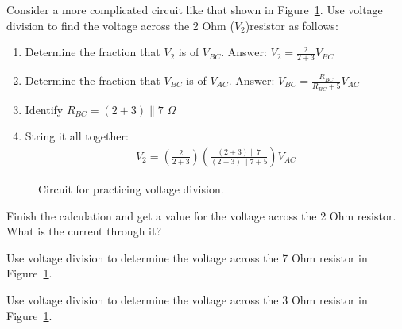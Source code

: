 Consider a more complicated circuit like that shown in Figure~\ref{F:3VD}. Use voltage division to find the voltage across the 2 Ohm ($V_2$)resistor as follows:

\begin{enumerate}
\item Determine the fraction that $V_2$ is of $V_{BC}$. Answer: $V_2=\frac{2}{2+3}V_{BC}$
\item Determine the fraction that $V_{BC}$ is of $V_{AC}$. Answer: $V_{BC}=\frac{R_{BC}}{R_{BC}+5}V_{AC}$
\item Identify $R_{BC} = (2+3) \parallel 7$ $\Omega$
\item String it all together: 
\begin{align}
V_2=(\frac{2}{2+3})(\frac{(2+3) \parallel 7}{(2+3) \parallel 7+5})V_{AC}
\end{align}
\end{enumerate}

\par
\begin{figure}[H]
\begin{center}
\caption{Circuit for practicing voltage division.}
\label{F:3VD}
\end{center}
\end{figure}

\begin{blevel}
Finish the calculation and get a value for the voltage across the 2 Ohm resistor. What is the current through it? 
\end{blevel}

\begin{clevel}
Use voltage division to determine the voltage across the 7 Ohm resistor in Figure~\ref{F:3VD}. 
\end{clevel}

\begin{clevel}
Use voltage division to determine the voltage across the 3 Ohm resistor in Figure~\ref{F:3VD}. 
\end{clevel}
